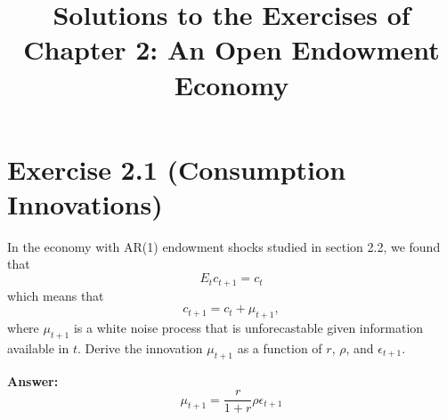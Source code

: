 \documentclass{article}
\begin{document}
\title{Solutions to the Exercises of Chapter 2: An Open Endowment Economy}
\date{}
\maketitle

\section*{Exercise 2.1 (Consumption Innovations)}
In the economy with AR(1) endowment shocks studied in section 2.2, we found that 
\[
E_t c_{t+1} = c_t
\]
which means that 
\[
c_{t+1} = c_t + \mu_{t+1},
\]
where \(\mu_{t+1}\) is a white noise process that is unforecastable given information available in \(t\). 
Derive the innovation \(\mu_{t+1}\) as a function of \(r\), \(\rho\), and \(\epsilon_{t+1}\).

\textbf{Answer:} 
\[
\mu_{t+1} = \frac{r}{1+r} \rho \epsilon_{t+1}
\]
\end{document}
